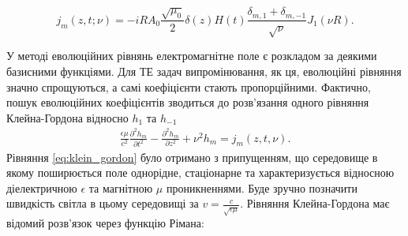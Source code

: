\begin{equation} 
j_m (z, t; \nu) = - i R A_0 \frac{\sqrt{\mu_0}}{2} \delta(z) H(t) 
\frac{\delta_{m,1} + \delta_{m,-1}}{\sqrt{\nu}} J_1 (\nu R).
\end{equation}

У методі еволюційних рівнянь електромагнітне поле є розкладом за 
деякими базисними функціями. Для ТЕ задач випромінювання, як ця, еволюційні 
рівняння значно спрощуються, а самі коефіцієнти стають пропорційними.
Фактично, пошук еволюційних коефіцієнтів зводиться до розв'язання одного
рівняння Клейна-Гордона відносно $ h_1 $ та $ h_{-1} $
%
%
%
%
\begin{equation} \begin{aligned} \label{eq:klein_gordon}
\frac{\epsilon \mu}{c^2} \frac{\partial^2 h_m}{\partial t^2} - 
\frac{\partial^2 h_m}{\partial z^2} + \nu^2 h_m = j_m (z,t,\nu).
\end{aligned} \end{equation}
%
Рівняння \eqref{eq:klein_gordon} було отримано з припущенням, що середовище 
в якому поширюється поле однорідне, стаціонарне та характеризується 
відносною діелектричною $ \epsilon $ та магнітною $ \mu $ проникненнями.
Буде зручно позначити швидкість світла в цьому середовищі за 
$ v = \frac{c}{\sqrt{\epsilon \mu}} $. Рівняння Клейна-Гордона
має відомий розв'язок через функцію Рімана:

